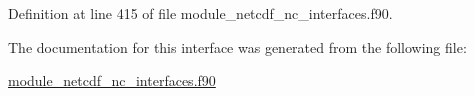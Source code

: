 Definition at line 415 of file module\+\_\+netcdf\+\_\+nc\+\_\+interfaces.\+f90.



The documentation for this interface was generated from the following file\+:\begin{DoxyCompactItemize}
\item 
\hyperlink{module__netcdf__nc__interfaces_8f90}{module\+\_\+netcdf\+\_\+nc\+\_\+interfaces.\+f90}\end{DoxyCompactItemize}
